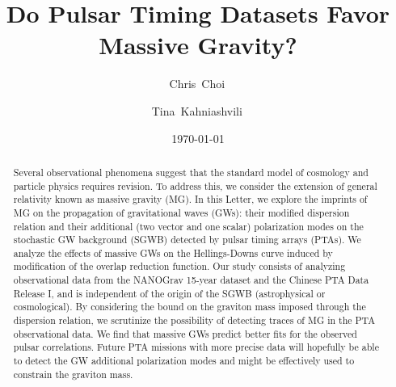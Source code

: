 \documentclass[10pt,prd,twocolumn,aps,nofootinbib,nobibnotes,superscriptaddress,preprintnumbers]{revtex4-2}
\begin{document}
\title{Do Pulsar Timing Datasets Favor Massive Gravity?}

\date{\today}
\author{Chris~Choi\,}

\author{Tina~Kahniashvili\,}

\begin{abstract}

Several observational phenomena suggest that the standard model of cosmology and particle physics requires revision. To address this, we consider the extension of general relativity known as massive gravity (MG). In this Letter, we explore the imprints of MG on the propagation of gravitational waves (GWs): their modified dispersion relation and their additional (two vector and one scalar) polarization modes on the stochastic GW background (SGWB) detected by pulsar timing arrays (PTAs). We analyze the effects of massive GWs on the Hellings-Downs curve induced by modification of the overlap reduction function. Our study consists of analyzing observational data from the NANOGrav 15-year dataset and the Chinese PTA Data Release I, and is independent of the origin of the SGWB (astrophysical or cosmological). By considering the bound on the graviton mass imposed through the dispersion relation, we scrutinize the possibility of detecting traces of MG in the PTA observational data. We find that massive GWs predict better fits for the observed pulsar correlations. Future PTA missions with more precise data will hopefully be able to detect the GW additional polarization modes and might be effectively used to constrain the graviton mass.
\end{abstract}

\maketitle
\end{document}
